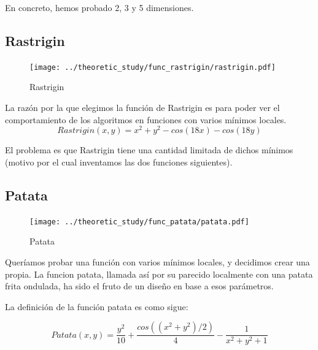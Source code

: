 \documentclass[10pt]{article}
\theoremstyle{definition}
\begin{document}
En concreto, hemos probado 2, 3 y 5 dimensiones.

\subsection{Rastrigin} \label{sub:fun-rastrigin}

\begin{figure}
  \vspace{-85pt}
  \begin{center}
    \texttt{[image: ../theoretic\_study/func\_rastrigin/rastrigin.pdf]}
  \end{center}
  \vspace{-60pt}
  \caption{Rastrigin}
  \vspace{-50pt}
\end{figure}

La razón por la que elegimos la función de Rastrigin es para poder ver el
comportamiento de los algoritmos en funciones con varios mínimos locales. 
\begin{displaymath}
Rastrigin(x,y)=x^2+y^2-cos(18x)-cos(18y)
\end{displaymath}

El problema es que Rastrigin tiene una cantidad limitada de dichos
mínimos (motivo por el cual inventamos las dos funciones siguientes).


\subsection{Patata} \label{sub:fun-patata}

\begin{figure}
  \vspace{-60pt}
  \begin{center}
    \texttt{[image: ../theoretic\_study/func\_patata/patata.pdf]}
  \end{center}
  \vspace{-60pt}
  \caption{Patata}
  \vspace{-60pt}	
\end{figure}

Queríamos probar una función con varios mínimos locales, y decidimos
crear una propia. La funcion patata, llamada así por su parecido
localmente con una patata frita ondulada, ha sido el fruto de un
diseño en base a esos parámetros.

La definición de la función patata es como sigue:

\begin{displaymath}
	Patata(x,y)=\frac{y^2}{10} + \frac{cos((x^2+y^2)/2)}{4} - \frac{1}{x^2+y^2+1}
\end{displaymath}
\end{document}
